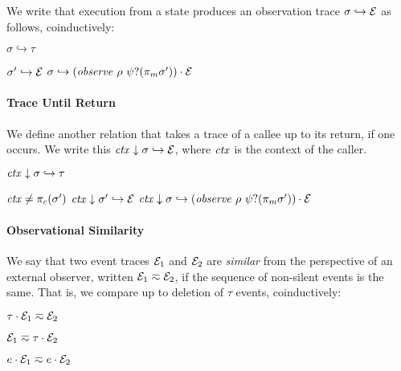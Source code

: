 \documentclass[10pt,conference]{ieeetran}%
\theoremstyle{definition}
\begin{document}
We write that execution from a state produces an observation trace \(\sigma \hookrightarrow \mathcal{E}\)
as follows, coinductively:

         {\(\sigma \hookrightarrow \tau\)}

            {\(\sigma' \hookrightarrow \mathcal{E}\)}
            {\(\sigma \hookrightarrow (\mathit{observe} ~ \rho ~ \psi? (\pi_m{\sigma'})) \cdot \mathcal{E}\)}

\paragraph*{Trace Until Return}

We define another relation that takes a trace of a callee up to its return, if one occurs.
We write this \(\mathit{ctx} \downarrow \sigma \hookrightarrow \mathcal{E}\), where \(\mathit{ctx}\)
is the context of the caller.

         {\(\mathit{ctx} \downarrow \sigma \hookrightarrow \tau\)}

              {\(\mathit{ctx} \not = \pi_c(\sigma')\)}
              {\(\mathit{ctx} \downarrow \sigma' \hookrightarrow \mathcal{E}\)}
              {\(\mathit{ctx} \downarrow \sigma \hookrightarrow (\mathit{observe} ~ \rho ~ \psi? (\pi_m{\sigma'})) \cdot \mathcal{E}\)}


\paragraph*{Observational Similarity}

We say that two event traces $\mathcal{E}_1$ and $\mathcal{E}_2$ are {\em similar}
from the perspective of an external observer, written \(\mathcal{E}_1 \eqsim
\mathcal{E}_2\), if the sequence of non-silent events is the same. That is, we
compare up to deletion of \(\tau\) events, coinductively:

\begin{minipage}{.4\columnwidth}
  \judgment{}{\(\obsT \eqsim \obsT\)}
\end{minipage}
\begin{minipage}{.4\columnwidth}
           {\(\tau \cdot \mathcal{E}_1 \eqsim \mathcal{E}_2\)}
\end{minipage}

\begin{minipage}{.4\columnwidth}
           {\(\mathcal{E}_1 \eqsim \tau \cdot \mathcal{E}_2\)}
\end{minipage}
\begin{minipage}{.4\columnwidth}
           {\(e \cdot \mathcal{E}_1 \eqsim e \cdot \mathcal{E}_2\)}
\end{minipage}
\end{document}
